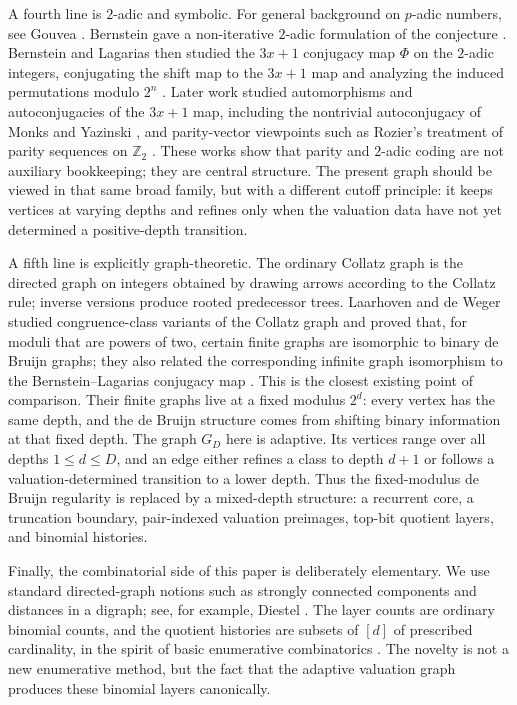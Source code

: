\documentclass[11pt]{amsart}
\theoremstyle{definition}
\theoremstyle{remark}
\begin{document}
A fourth line is $2$-adic and symbolic.  For general background on $p$-adic numbers, see Gouvea \cite{Gouvea1997}.  Bernstein gave a non-iterative $2$-adic formulation of the conjecture \cite{Bernstein1994}.  Bernstein and Lagarias then studied the $3x+1$ conjugacy map $\Phi$ on the $2$-adic integers, conjugating the shift map to the $3x+1$ map and analyzing the induced permutations modulo $2^n$ \cite{BernsteinLagarias1996}.  Later work studied automorphisms and autoconjugacies of the $3x+1$ map, including the nontrivial autoconjugacy of Monks and Yazinski \cite{MonksYazinski2004}, and parity-vector viewpoints such as Rozier's treatment of parity sequences on $\mathbb Z_2$ \cite{Rozier2019}.  These works show that parity and $2$-adic coding are not auxiliary bookkeeping; they are central structure.  The present graph should be viewed in that same broad family, but with a different cutoff principle: it keeps vertices at varying depths and refines only when the valuation data have not yet determined a positive-depth transition.

A fifth line is explicitly graph-theoretic.  The ordinary Collatz graph is the directed graph on integers obtained by drawing arrows according to the Collatz rule; inverse versions produce rooted predecessor trees.  Laarhoven and de Weger studied congruence-class variants of the Collatz graph and proved that, for moduli that are powers of two, certain finite graphs are isomorphic to binary de Bruijn graphs; they also related the corresponding infinite graph isomorphism to the Bernstein--Lagarias conjugacy map \cite{LaarhovenDeWeger2013}.  This is the closest existing point of comparison.  Their finite graphs live at a fixed modulus $2^d$: every vertex has the same depth, and the de Bruijn structure comes from shifting binary information at that fixed depth.  The graph $G_D$ here is adaptive.  Its vertices range over all depths $1\le d\le D$, and an edge either refines a class to depth $d+1$ or follows a valuation-determined transition to a lower depth.  Thus the fixed-modulus de Bruijn regularity is replaced by a mixed-depth structure: a recurrent core, a truncation boundary, pair-indexed valuation preimages, top-bit quotient layers, and binomial histories.

Finally, the combinatorial side of this paper is deliberately elementary.  We use standard directed-graph notions such as strongly connected components and distances in a digraph; see, for example, Diestel \cite{DiestelGraphTheory}.  The layer counts are ordinary binomial counts, and the quotient histories are subsets of $[d]$ of prescribed cardinality, in the spirit of basic enumerative combinatorics \cite{StanleyEC1}.  The novelty is not a new enumerative method, but the fact that the adaptive valuation graph produces these binomial layers canonically.
\end{document}
